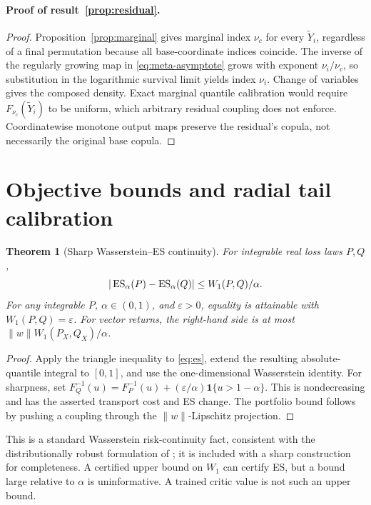 \documentclass[11pt]{article}
\newtheorem{theorem}{Theorem}[section]
\theoremstyle{definition}\newtheorem{definition}[theorem]{Definition}
\theoremstyle{remark}\newtheorem{remark}[theorem]{Remark}
\newcommand{\Wone}{W_1}\newcommand{\ind}{\mathbf 1}\newcommand{\softplus}{\operatorname{softplus}}
\begin{document}
\paragraph{Proof of result~\ref{prop:residual}.}
\begin{proof}
Proposition~\ref{prop:marginal} gives marginal index $\nu_c$ for every $\widetilde Y_i$, regardless of a final permutation because all base-coordinate indices coincide. The inverse of the regularly growing map in \eqref{eq:meta-asymptote} grows with exponent $\nu_i/\nu_c$, so substitution in the logarithmic survival limit yields index $\nu_i$. Change of variables gives the composed density. Exact marginal quantile calibration would require $F_{\nu_c}(\widetilde Y_i)$ to be uniform, which arbitrary residual coupling does not enforce. Coordinatewise monotone output maps preserve the residual's copula, not necessarily the original base copula.
\end{proof}
\section{Objective bounds and radial tail calibration}\label{sec:certificates}
\begin{theorem}[Sharp Wasserstein--ES continuity]\label{thm:w1}
For integrable real loss laws $P,Q$,
\begin{equation}\label{eq:w1-es}
|\ES_\alpha(P)-\ES_\alpha(Q)|\le\Wone(P,Q)/\alpha.
\end{equation}
For any integrable $P$, $\alpha\in(0,1)$, and $\varepsilon>0$, equality is attainable with $\Wone(P,Q)=\varepsilon$. For vector returns, the right-hand side is at most $\|w\|\Wone(P_X,Q_X)/\alpha$.
\end{theorem}
\begin{proof}
Apply the triangle inequality to \eqref{eq:es}, extend the resulting absolute-quantile integral to $[0,1]$, and use the one-dimensional Wasserstein identity. For sharpness, set $F_Q^{-1}(u)=F_P^{-1}(u)+(\varepsilon/\alpha)\ind\{u>1-\alpha\}$. This is nondecreasing and has the asserted transport cost and ES change. The portfolio bound follows by pushing a coupling through the $\|w\|$-Lipschitz projection.
\end{proof}
This is a standard Wasserstein risk-continuity fact, consistent with the distributionally robust formulation of \citet{esfahani2018}; it is included with a sharp construction for completeness. A certified upper bound on $\Wone$ can certify ES, but a bound large relative to $\alpha$ is uninformative. A trained critic value is not such an upper bound.
\end{document}
